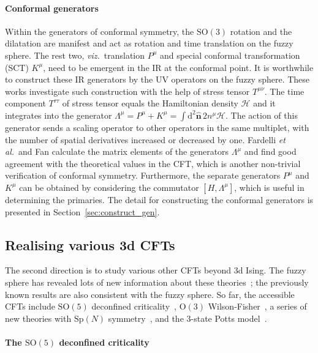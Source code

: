\documentclass{timesjhep}
\begin{document}
\paragraph{Conformal generators~\cite{Fardelli2024,Fan2024}}

Within the generators of conformal symmetry, the $\mathrm{SO}(3)$ rotation and the dilatation are manifest and act as rotation and time translation on the fuzzy sphere. The rest two, \textit{viz.}~translation $P^\mu$ and special conformal transformation (SCT) $K^\mu$, need to be emergent in the IR at the conformal point. It is worthwhile to construct these IR generators by the UV operators on the fuzzy sphere. These works investigate such construction with the help of stress tensor $T^{\mu\nu}$. The time component $T^{\tau\tau}$ of stress tensor equals the Hamiltonian density $\mathcal{H}$ and it integrates into the generator $\Lambda^\mu=P^\mu+K^\mu=\int\mathrm{d}^2\hat{\mathbf{n}}\,2n^\mu\mathcal{H}$. The action of this generator sends a scaling operator to other operators in the same multiplet, with the number of spatial derivatives increased or decreased by one. Fardelli \textit{et al.}~and Fan calculate the matrix elements of the generators $\Lambda^\mu$ and find good agreement with the theoretical values in the CFT, which is another non-trivial verification of conformal symmetry. Furthermore, the separate generators $P^\mu$ and $K^\mu$ can be obtained by considering the commutator $[H,\Lambda^\mu]$, which is useful in determining the primaries. The detail for constructing the conformal generators is presented in Section~\ref{sec:construct_gen}.

\subsection{Realising various 3d CFTs}

The second direction is to study various other CFTs beyond 3d Ising. The fuzzy sphere has revealed lots of new information about these theories~; the previously known results are also consistent with the fuzzy sphere. So far, the accessible CFTs include $\mathrm{SO}(5)$ deconfined criticality~\cite{Zhou2023}, $\mathrm{O}(3)$ Wilson-Fisher~\cite{Han2023Dec}, a series of new theories with $\mathrm{Sp}(N)$ symmetry~\cite{Zhou2024Oct}, and the 3-state Potts model~\cite{Yang2025}.

\paragraph{The $\mathrm{SO}(5)$ deconfined criticality~\cite{Zhou2023}}
\end{document}
